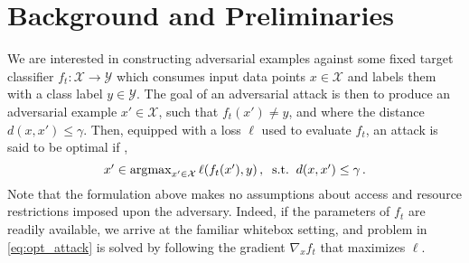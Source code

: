 \section{Background and Preliminaries}
\vspace{-5pt}

We are interested in constructing adversarial examples against some fixed 
target classifier $f_{t}: \mathcal{X} \to \mathcal{Y}$ which consumes input data points $x \in \mathcal{X}$ and labels them with a class label $y \in \mathcal{Y}$. The goal of an adversarial attack is then to produce an adversarial example $x' \in \mathcal{X}$, such that $f_t(x') \neq y$, and where the distance $d(x,x') \leq \gamma$. Then, equipped with a loss $\ell$ used to evaluate $f_{t}$, an attack is said to be optimal if \citep{carlini2017magnet, madry2017towards}, 
\begin{equation}\label{eq:opt_attack}
    \textstyle x' \in \operatorname*{\arg\!\max}_{x'\in {\mathcal{X}}}\ell(f_{t}(x'),y) \,, \;\; \text{s.t.} \;\; d(x,x') \leq \gamma \,.
\end{equation}
Note that the formulation above makes no assumptions about access and resource restrictions imposed upon the adversary. Indeed, if the parameters of $f_t$ are readily available, we arrive at the familiar whitebox setting, and problem in \eqref{eq:opt_attack} is solved by following the gradient $\nabla_x f_{t}$ that maximizes $\ell$. 


